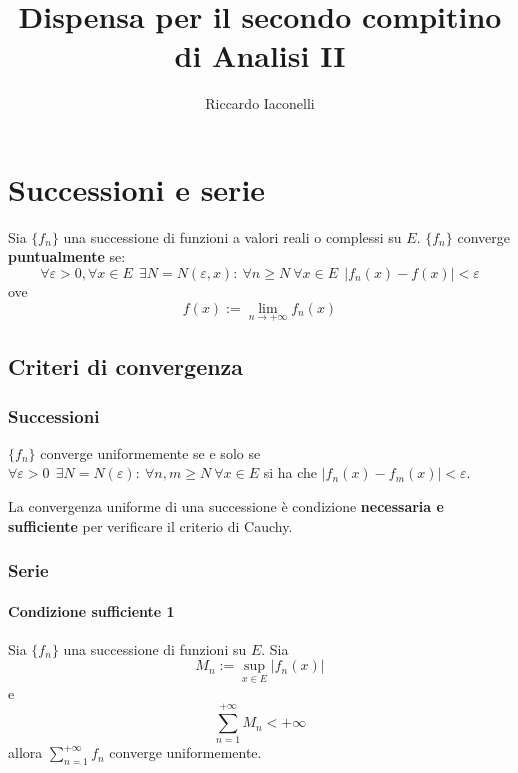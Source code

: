 \documentclass[a4paper,12pt]{article}
\begin{document}
\begin{titlepage}
\title{Dispensa per il secondo compitino di Analisi II}
\author{Riccardo Iaconelli}
\maketitle
\end{titlepage}

\begin{titlepage}
\tableofcontents
\end{titlepage}

\section{Successioni e serie}

Sia $\{f_n\}$ una successione di funzioni a valori reali o complessi su $E$.
$\{f_n\}$ converge \textbf{puntualmente} se: $$\forall \varepsilon>0, \forall x \in E\ \ \exists N=N(\varepsilon, x):\ \forall n \geq N\ \forall x\in E\ \ |f_n(x) - f(x)| < \varepsilon$$ ove $$f(x):=\lim_{n\to+\infty} f_n(x)$$
\subsection{Criteri di convergenza}

\subsubsection{Successioni}
$\{f_n\}$ converge uniformemente se e solo se $\forall \varepsilon>0\ \ \exists N=N(\varepsilon):\ \forall n,m \geq N\ \forall x\in E$ si ha che $|f_n(x) - f_m(x)| < \varepsilon$.

La convergenza uniforme di una successione è condizione \textbf{necessaria e sufficiente} per verificare il criterio di Cauchy.

\subsubsection{Serie}

\paragraph{Condizione sufficiente 1}
Sia $\{f_n\}$ una successione di funzioni su $E$. Sia $$M_n:= \displaystyle\sup_{x\in E}|f_n(x)|$$ e $$\sum_{n=1}^{+\infty}M_n<+\infty$$
allora $\displaystyle\sum_{n=1}^{+\infty}f_n$ converge uniformemente.
\end{document}
